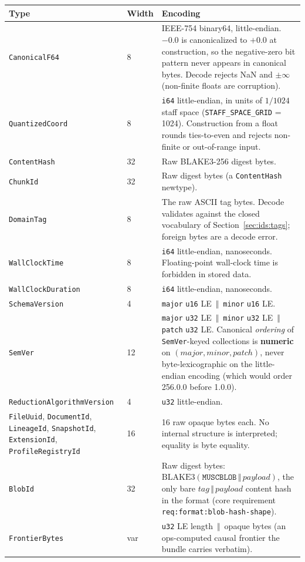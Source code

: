 \documentclass[11pt,letterpaper]{report}
\newcounter{requirement}[chapter]
\newcommand{\cat}{\ensuremath{\,\Vert\,}}
\begin{document}
\begingroup\small
\begin{longtable}{>{\raggedright\arraybackslash}p{1.7in} p{0.5in} p{3.45in}}
  \toprule
  \textbf{Type} & \textbf{Width} & \textbf{Encoding} \\
  \midrule
  \endhead
  \texttt{CanonicalF64} & 8 &
    IEEE-754 binary64, little-endian. $-0.0$ is canonicalized to $+0.0$ at
    construction, so the negative-zero bit pattern never appears in canonical
    bytes. Decode rejects NaN and $\pm\infty$ (non-finite floats are
    corruption). \\
  \texttt{QuantizedCoord} & 8 &
    \texttt{i64} little-endian, in units of $1/1024$ staff space
    (\texttt{STAFF\_SPACE\_GRID} = 1024). Construction from a float rounds
    ties-to-even and rejects non-finite or out-of-range input. \\
  \texttt{ContentHash} & 32 & Raw BLAKE3-256 digest bytes. \\
  \texttt{ChunkId} & 32 & Raw digest bytes (a \texttt{ContentHash} newtype). \\
  \texttt{DomainTag} & 8 &
    The raw ASCII tag bytes. Decode validates against the closed vocabulary
    of Section~\ref{sec:ids:tags}; foreign bytes are a decode error. \\
  \texttt{WallClockTime} & 8 &
    \texttt{i64} little-endian, nanoseconds. Floating-point wall-clock time
    is forbidden in stored data. \\
  \texttt{WallClockDuration} & 8 & \texttt{i64} little-endian, nanoseconds. \\
  \texttt{SchemaVersion} & 4 &
    \texttt{major} \texttt{u16} LE \cat{} \texttt{minor} \texttt{u16} LE. \\
  \texttt{SemVer} & 12 &
    \texttt{major} \texttt{u32} LE \cat{} \texttt{minor} \texttt{u32} LE
    \cat{} \texttt{patch} \texttt{u32} LE. Canonical \emph{ordering} of
    \texttt{SemVer}-keyed collections is \textbf{numeric} on
    $(\mathit{major},\mathit{minor},\mathit{patch})$, never byte-lexicographic
    on the little-endian encoding (which would order 256.0.0 before 1.0.0). \\
  \texttt{Reduction\allowbreak AlgorithmVersion} & 4 & \texttt{u32}
    little-endian. \\
  \texttt{FileUuid}, \texttt{DocumentId}, \texttt{LineageId},
  \texttt{SnapshotId}, \texttt{ExtensionId}, \texttt{ProfileRegistryId} & 16 &
    16 raw opaque bytes each. No internal structure is interpreted;
    equality is byte equality. \\
  \texttt{BlobId} & 32 &
    Raw digest bytes: $\mathrm{BLAKE3}(\texttt{MUSCBLOB} \cat
    \mathit{payload})$, the only bare $\mathit{tag} \cat \mathit{payload}$
    content hash in the format (core requirement
    \texttt{req:format:blob-hash-shape}). \\
  \texttt{FrontierBytes} & var &
    \texttt{u32} LE length \cat{} opaque bytes (an ops-computed causal
    frontier the bundle carries verbatim). \\
  \bottomrule
\end{longtable}
\endgroup
\end{document}

